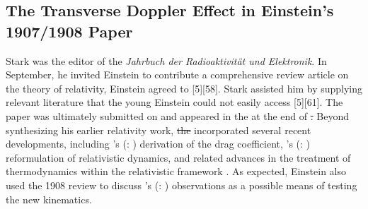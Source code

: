 \documentclass[pdflatex]{sn-jnl} %
\newcommand{\TDE}{Transverse Doppler Effect\xspace}
\renewcommand{\citets}[2][]{\citeauthor{#2}'s (\citeyear{#2}\if\relax\detokenize{#1}\relax\else: #1\fi)}
\providecommand{\DIFadd}[1]{{\protect\color{blue}\uwave{#1}}} %
\providecommand{\DIFdel}[1]{{\protect\color{red}\sout{#1}}}                      %
\providecommand{\DIFaddbegin}{} %
\providecommand{\DIFaddend}{} %
\providecommand{\DIFdelbegin}{} %
\providecommand{\DIFdelend}{} %
\begin{document}
\DIFaddbegin \medskip
\DIFaddend %



\subsection{The \TDE{} in Einstein’s 1907/1908  Paper}
%
Stark was the editor of the \emph{Jahrbuch der Radioaktivität und Elektronik}. In September, he invited Einstein to contribute a comprehensive review article on the theory of relativity, \DIFaddbegin \DIFadd{and }\DIFaddend Einstein agreed to  [5][58]. Stark assisted him by supplying relevant literature that the young Einstein could not easily access [5][61]. The paper was ultimately submitted on  and appeared in the \DIFdelbegin %
\DIFdelend \DIFaddbegin {} \DIFaddend at the end of \DIFdelbegin %
\DIFdel{. }\DIFdelend \DIFaddbegin \DIFadd{January~1908. }\DIFaddend Beyond synthesizing his earlier relativity work, \DIFdelbegin \DIFdel{the }\DIFdelend \citet{Einstein1908} incorporated several recent developments, including \citets{Laue1907} derivation of the drag coefficient, \citets{Planck1906a} reformulation of relativistic dynamics, and related advances in the treatment of thermodynamics within the relativistic framework \citep{Planck1907}. As expected, Einstein also used the 1908 review to discuss \citets{Stark1906} observations as a possible means of testing the new kinematics.
\end{document}
